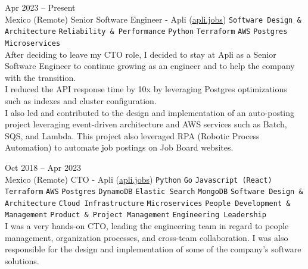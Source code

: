 \documentclass[9pt]{developercv} %
\begin{document}
\begin{entrylist}
    \entry
        {
            Apr 2023 -- Present
            \\\footnotesize{Mexico (Remote)}
        }
        {Senior Software Engineer - Apli ({\href{https://apli.jobs/}{\underline{apli.jobs}}}) }
        {
            \texttt{Software Design \& Architecture}
            \slashsep\texttt{Reliability \& Performance}
            \slashsep\texttt{Python}
            \slashsep\texttt{Terraform}
            \slashsep\texttt{AWS}
            \slashsep\texttt{Postgres}
            \slashsep\texttt{Microservices}
        }
        {\\
            After deciding to leave my CTO role, I decided to stay at Apli as a Senior Software 
            Engineer to continue growing as an engineer and to help the company with the transition.\\

            I reduced the API response time by 10x by leveraging Postgres optimizations such as 
            indexes and cluster configuration.\\

            I also led and contributed to the design and implementation of an auto-posting project
            leveraging event-driven architecture and AWS services such as Batch, SQS, and Lambda. 
            This project also leveraged RPA (Robotic Process Automation) to automate job postings on
            Job Board websites.
        }

    \entry
        {
            Oct 2018 -- Apr 2023
            \\\footnotesize{Mexico (Remote)}
        }
        {CTO - Apli ({\href{https://apli.jobs/}{\underline{apli.jobs}}}) }
        {
            \texttt{Python}
            \slashsep\texttt{Go}
            \slashsep\texttt{Javascript (React)}
            \slashsep\texttt{Terraform}
            \slashsep\texttt{AWS}
            \slashsep\texttt{Postgres}
            \slashsep\texttt{DynamoDB}
            \slashsep\texttt{Elastic Search}
            \slashsep\texttt{MongoDB}
            \slashsep\texttt{Software Design \& Architecture}
            \slashsep\texttt{Cloud Infrastructure}
            \slashsep\texttt{Microservices}
            \slashsep\texttt{People Development \& Management}
            \slashsep\texttt{Product \& Project Management}
            \slashsep\texttt{Engineering Leadership}
        }
        {\\
            I was a very hands-on CTO, leading the engineering team in regard to people management,
            organization processes, and cross-team collaboration. I was also responsible for the 
            design and implementation of some of the company's software solutions.\\

}
\end{entrylist}
\end{document}
